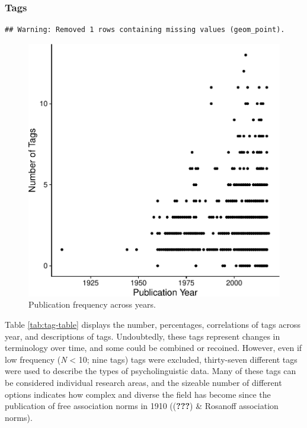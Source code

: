 \documentclass[english,man]{apa6}
\theoremstyle{definition}
\theoremstyle{definition}
\theoremstyle{definition}
\theoremstyle{remark}
\begin{document}
\subsubsection{Tags}\label{tags}

\begin{verbatim}
## Warning: Removed 1 rows containing missing values (geom_point).
\end{verbatim}

\begin{figure}
\centering
\includegraphics{LAB_files/figure-latex/tag-fig-1.pdf}
\caption{\label{fig:tag-fig}Publication frequency across years.}
\end{figure}

Table \ref{tab:tag-table} displays the number, percentages, correlations
of tags across year, and descriptions of tags. Undoubtedly, these tags
represent changes in terminology over time, and some could be combined
or recoined. However, even if low frequency (\emph{N} \textless{} 10;
nine tags) tags were excluded, thirty-seven different tags were used to
describe the types of psycholinguistic data. Many of these tags can be
considered individual research areas, and the sizeable number of
different options indicates how complex and diverse the field has become
since the publication of free association norms in 1910
(({\textbf{???}}) \& Rosanoff association norms).
\end{document}
